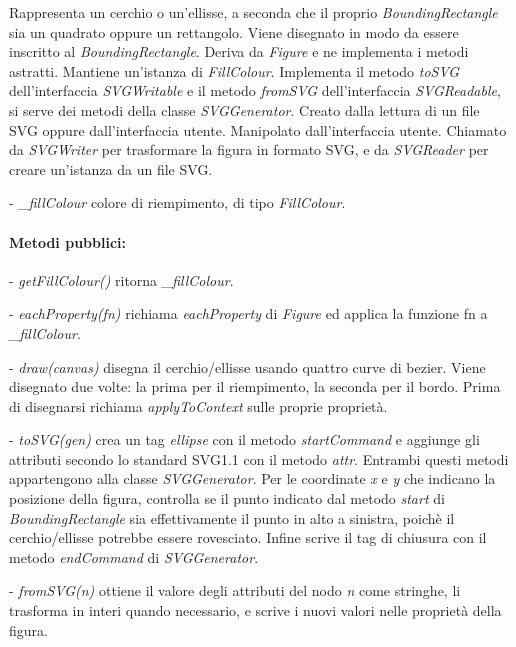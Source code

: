 Rappresenta un cerchio o un'ellisse, a seconda che il proprio \textit{BoundingRectangle} sia un quadrato oppure un rettangolo. Viene disegnato in modo da essere inscritto al \textit{BoundingRectangle}.
Deriva da \textit{Figure} e ne implementa i metodi astratti. Mantiene un'istanza di \textit{FillColour}. Implementa il metodo \textit{toSVG} dell'interfaccia \textit{SVGWritable} e il metodo \textit{fromSVG} dell'interfaccia \textit{SVGReadable}, si serve dei metodi della classe \textit{SVGGenerator}.
Creato dalla lettura di un file SVG oppure dall'interfaccia utente. Manipolato dall'interfaccia utente. Chiamato da \textit{SVGWriter} per trasformare la figura in formato SVG, e da \textit{SVGReader} per creare un'istanza da un file SVG.
\begin{elencopuntato}[\subsubsecindent]
\item[-] \textit{{\_}fillColour} colore di riempimento, di tipo \textit{FillColour}.
\end{elencopuntato}
\paragraph{Metodi pubblici:}
\begin{elencopuntato}[\subsubsecindent]
\item[-] \textit{getFillColour()} ritorna \textit{{\_}fillColour}.
\item[-] \textit{eachProperty(fn)} richiama \textit{eachProperty} di \textit{Figure} ed applica la funzione fn a \textit{{\_}fillColour}.
\item[-] \textit{draw(canvas)} disegna il cerchio/ellisse usando quattro curve di bezier. Viene disegnato due volte: la prima per il riempimento, la seconda per il bordo. Prima di disegnarsi richiama \textit{applyToContext} sulle proprie propriet\`a.
\item[-] \textit{toSVG(gen)} crea un tag \textit{ellipse} con il metodo \textit{startCommand} e aggiunge gli attributi secondo lo standard SVG1.1 con il metodo \textit{attr}. Entrambi questi metodi appartengono alla classe \textit{SVGGenerator}. Per le coordinate \textit{x} e \textit{y} che indicano la posizione della figura, controlla se il punto indicato dal metodo \textit{start} di \textit{BoundingRectangle} sia effettivamente il punto in alto a sinistra, poich\`e il cerchio/ellisse potrebbe essere rovesciato. Infine scrive il tag di chiusura con il metodo \textit{endCommand} di \textit{SVGGenerator}.
\item[-] \textit{fromSVG(n)} ottiene il valore degli attributi del nodo \textit{n} come stringhe, li trasforma in interi quando necessario, e scrive i nuovi valori nelle propriet\`a della figura. 
\end{elencopuntato}

